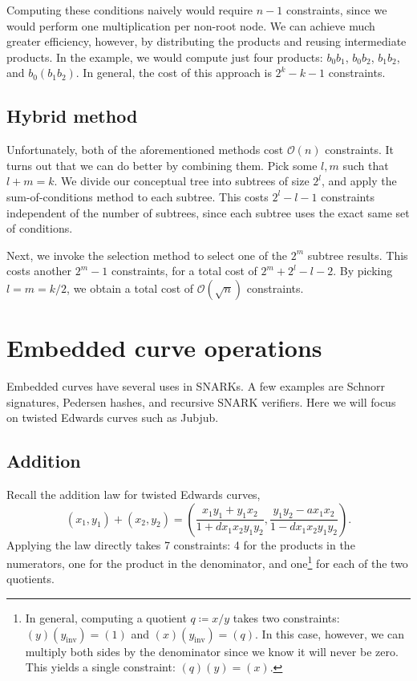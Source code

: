 \documentclass{article}
\begin{document}
Computing these conditions naively would require $n - 1$ constraints, since we would perform one multiplication per non-root node. We can achieve much greater efficiency, however, by distributing the products and reusing intermediate products. In the example, we would compute just four products: $b_0 b_1$, $b_0 b_2$, $b_1 b_2$, and $b_0 (b_1 b_2)$. In general, the cost of this approach is $2^k - k - 1$ constraints.


\subsection{Hybrid method} \label{sec:random-access-hybrid}

Unfortunately, both of the aforementioned methods cost $\mathcal{O}(n)$ constraints. It turns out that we can do better by combining them. Pick some $l, m$ such that $l + m = k$. We divide our conceptual tree into subtrees of size $2^l$, and apply the sum-of-conditions method to each subtree. This costs $2^l - l - 1$ constraints independent of the number of subtrees, since each subtree uses the exact same set of conditions.

Next, we invoke the selection method to select one of the $2^m$ subtree results. This costs another $2^m - 1$ constraints, for a total cost of $2^m + 2^l - l - 2$. By picking $l = m = k/2$, we obtain a total cost of $\mathcal{O}(\sqrt{n})$ constraints.


\section{Embedded curve operations}

Embedded curves have several uses in SNARKs. A few examples are Schnorr signatures, Pedersen hashes, and recursive SNARK verifiers.
Here we will focus on twisted Edwards curves such as Jubjub.


\subsection{Addition}

Recall the addition law for twisted Edwards curves,
\begin{equation}
  (x_1, y_1) + (x_2, y_2) = \left( \frac{x_1 y_1 + y_1 x_2}{1 + d x_1 x_2 y_1 y_2}, \frac{y_1 y_2 - a x_1 x_2}{1 - d x_1 x_2 y_1 y_2} \right).
\end{equation}
Applying the law directly takes 7 constraints: 4 for the products in the numerators, one for the product in the denominator, and one\footnote{In general, computing a quotient $q \coloneqq x / y$ takes two constraints: $(y) (y_\mathrm{inv}) = (1)$ and $(x) (y_\mathrm{inv}) = (q)$. In this case, however, we can multiply both sides by the denominator since we know it will never be zero. This yields a single constraint: $(q) (y) = (x)$.} for each of the two quotients.
\end{document}
